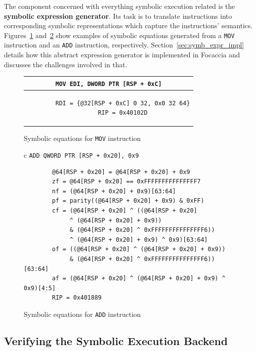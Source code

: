 The component concerned with everything symbolic execution related is the \textbf{symbolic expression generator}. Its
task is to translate instructions into corresponding symbolic representations which capture the instructions' semantics.
Figures~\ref{fig:symb_equation_mov} and~\ref{fig:symb_equation_add} show examples of symbolic equations generated from a
\texttt{MOV} instruction and an \texttt{ADD} instruction, respectively. Section~\ref{sec:symb_expr_impl} details how
this abstract expression generator is implemented in Focaccia and discusses the challenges involved in that.

\begin{figure}[htbp]
    \centering
    \begin{tabular}{c}
    \texttt{MOV        EDI, DWORD PTR [RSP + 0xC]} \\
    \midrule
    \begin{lstlisting}
        RDI = {@32[RSP + 0xC] 0 32, 0x0 32 64}
        RIP = 0x40102D
    \end{lstlisting}
    \end{tabular}
    \caption{Symbolic equations for \texttt{MOV} instruction}\label{fig:symb_equation_mov}
\end{figure}

\begin{figure}[htbp]
    \centering
    \begin{tabular}{c}
    \texttt{ADD        QWORD PTR [RSP + 0x20], 0x9} \\
    \midrule
    \begin{lstlisting}
        @64[RSP + 0x20] = @64[RSP + 0x20] + 0x9
        zf = @64[RSP + 0x20] == 0xFFFFFFFFFFFFFFF7
        nf = (@64[RSP + 0x20] + 0x9)[63:64]
        pf = parity((@64[RSP + 0x20] + 0x9) & 0xFF)
        cf = (@64[RSP + 0x20] ^ ((@64[RSP + 0x20]
             ^ (@64[RSP + 0x20] + 0x9))
             & (@64[RSP + 0x20] ^ 0xFFFFFFFFFFFFFFF6))
             ^ (@64[RSP + 0x20] + 0x9) ^ 0x9)[63:64]
        of = ((@64[RSP + 0x20] ^ (@64[RSP + 0x20] + 0x9))
             & (@64[RSP + 0x20] ^ 0xFFFFFFFFFFFFFFF6))[63:64]
        af = (@64[RSP + 0x20] ^ (@64[RSP + 0x20] + 0x9) ^ 0x9)[4:5]
        RIP = 0x401889
    \end{lstlisting}
    \end{tabular}
    \caption[]{Symbolic equations for \texttt{ADD} instruction}\label{fig:symb_equation_add}
\end{figure}

\subsection{Verifying the Symbolic Execution Backend}\label{sec:symb_exec_backend}

